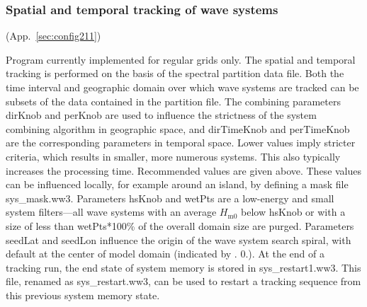 \vsssub
\subsubsection{Spatial and temporal tracking of wave systems} \label{sec:ww3systrk}
\vsssub

 (App.~\ref{sec:config211})

\vspace{\baselineskip} 
\noindent 
Program currently implemented for regular grids only. The spatial and temporal
tracking is performed on the basis of the spectral partition data file. Both
the time interval and geographic domain over which wave systems are tracked
can be subsets of the data contained in the partition file. The combining
parameters {\code dirKnob} and {\code perKnob} are used to influence the
strictness of the system combining algorithm in geographic space, and {\code
  dirTimeKnob} and {\code perTimeKnob} are the corresponding parameters in
temporal space. Lower values imply stricter criteria, which results in
smaller, more numerous systems. This also typically increases the processing
time. Recommended values are given above. These values can be influenced
locally, for example around an island, by defining a mask file {\file
  sys\_mask.ww3}.  Parameters {\code hsKnob} and {\code wetPts} are a
low-energy and small system filters---all wave systems with an average
$H_\mathrm{m0}$ below {\code hsKnob} or with a size of less than {\code
  wetPts}*100\% of the overall domain size are purged. Parameters {\code
  seedLat} and {\code seedLon} influence the origin of the wave system search
spiral, with default at the center of model domain (indicated by {. 0.}). At the end of a tracking run, the end state of system memory is
stored in {\file sys\_restart1.ww3}.  This file, renamed as {\file
  sys\_restart.ww3}, can be used to restart a tracking sequence from this
previous system memory state.

\pb
